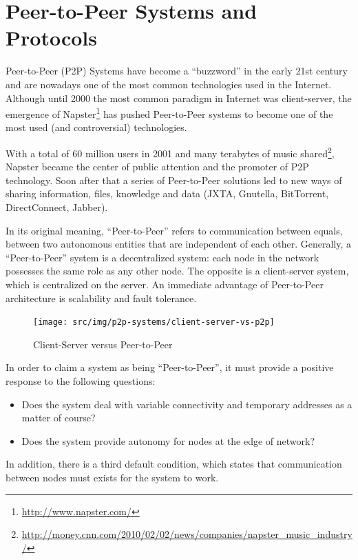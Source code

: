 
\chapter{Peer-to-Peer Systems and Protocols}
\label{chapter:p2p-systems}

Peer-to-Peer (P2P) Systems have become a ``buzzword'' in the early 21st
century and are nowadays one of the most common technologies used in the
Internet. Although until 2000 the most common paradigm in Internet was
client-server, the emergence of Napster\footnote{\url{http://www.napster.com/}} has pushed Peer-to-Peer
systems to become one of the most used (and controversial) technologies.

With a total of 60 million users in 2001 and many terabytes of music
shared\footnote{\url{http://money.cnn.com/2010/02/02/news/companies/napster_music_industry/}}, Napster became the center of public attention and the
promoter of P2P technology. Soon after that a series of Peer-to-Peer solutions
led to new ways of sharing information, files, knowledge and data (JXTA,
Gnutella, BitTorrent, DirectConnect, Jabber).

In its original meaning, ``Peer-to-Peer'' refers to communication between
equals, between two autonomous entities that are independent of each other.
Generally, a ``Peer-to-Peer'' system is a decentralized system: each node in
the network possesses the same role as any other node. The opposite is a
client-server system, which is centralized on the server. An immediate
advantage of Peer-to-Peer architecture is scalability and fault tolerance.

\begin{figure}
  \centering
  \texttt{[image: src/img/p2p-systems/client-server-vs-p2p]}
  \caption{Client-Server versus Peer-to-Peer}
  \label{fig:p2p-systems:client-server-vs-p2p}
\end{figure}

In order to claim a system as being ``Peer-to-Peer'', it must provide a
positive response to the following questions:
\begin{itemize}
  \item Does the system deal with variable connectivity and temporary
  addresses as a matter of course?
  \item Does the system provide autonomy for nodes at the edge of network?
\end{itemize}

In addition, there is a third default condition, which states that
communication between nodes must exists for the system to work.

